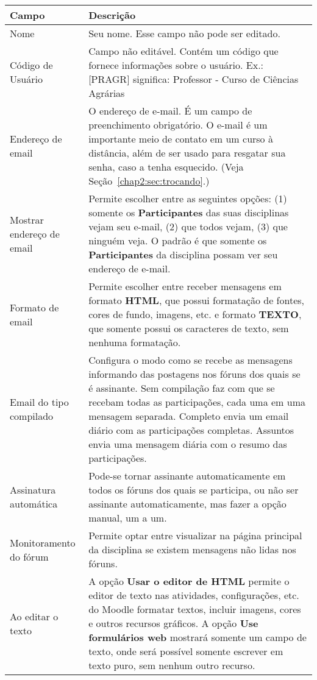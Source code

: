 \begin{longtable}{p{4cm}|p{9cm}}
\hline
   \rowcolor[rgb]{0.8,0.8,0.8}  \textbf{Campo} & \textbf{Descrição}\\
    \hline
    Nome  & Seu nome. Esse campo não pode ser editado. \\\hline
    Código de Usuário & Campo não editável. Contém um código que fornece informações sobre o usuário. Ex.: [PRAGR] significa:  Professor -  Curso de Ciências Agrárias  \\\hline
    Endereço de email & O endereço de e-mail. É um campo de preenchimento obrigatório. O e-mail é um importante meio de contato em um curso à distância, além de ser usado para resgatar sua senha, caso a tenha esquecido. (Veja Seção~\ref{chap2:sec:trocando}.) \\\hline
    Mostrar endereço de email & Permite escolher entre as seguintes opções: (1) somente os \textbf{Participantes} das suas disciplinas vejam seu e-mail, (2) que todos vejam, (3) que ninguém veja. O padrão é que somente os \textbf{Participantes} da disciplina possam ver seu endereço de e-mail. \\\hline
    Formato de email & Permite escolher entre receber mensagens em formato \textbf{HTML}, que possui formatação de fontes, cores de fundo, imagens, etc. e formato \textbf{TEXTO}, que somente possui os caracteres de texto, sem nenhuma formatação. \\\hline
    Email do tipo compilado & Configura o modo como se recebe as mensagens informando das postagens nos fóruns dos quais se é assinante. Sem compilação faz com que se recebam todas as participações, cada uma em uma mensagem separada. Completo envia um email diário com as participações completas. Assuntos envia uma mensagem diária com o resumo das participações. \\\hline
    Assinatura automática & Pode-se tornar assinante automaticamente em todos os fóruns dos quais se participa, ou não ser assinante automaticamente, mas fazer a opção manual, um a um. \\\hline
    Monitoramento do fórum & Permite optar entre visualizar na página principal da disciplina se existem mensagens não lidas nos fóruns. 
    \\\hline
    Ao editar o texto & A opção \textbf{Usar o editor de HTML} permite o editor de texto nas atividades, configurações, etc. do Moodle formatar textos, incluir imagens, cores e outros recursos gráficos. A opção \textbf{Use formulários web} mostrará somente um campo de texto, onde será possível somente escrever em texto puro, sem nenhum outro recurso. \\\hline
 

\end{longtable}
